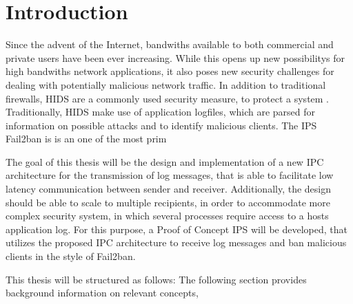 %
%

\chapter{Introduction}
\label{sec:intro}

Since the advent of the Internet, bandwiths available to both
commercial and private users have been ever increasing. While this opens up new possibilitys for high bandwiths
network applications, it also poses new security challenges for dealing with potentially malicious network traffic. In addition to traditional firewalls, 
\ac{HIDS} are a commonly used security measure, to protect a system  . Traditionally, \ac{HIDS} make use of application logfiles, which are parsed
for information on possible attacks and to identify malicious clients. The \ac{IPS} Fail2ban\cite{fail2ban} is 
is an one of the most prim
\par
The goal of this thesis will be the design and implementation of a new \ac{IPC} architecture for the
transmission of log messages, that is able to facilitate low latency communication
between sender and receiver. Additionally, the design should be able to scale to multiple
recipients, in order to accommodate more complex security system, in which several processes
require access to a hosts application log. For this purpose, a Proof of Concept \ac{IPS} will be 
developed, that utilizes the proposed \ac{IPC} architecture to receive log messages and ban malicious
clients in the style of Fail2ban. 


This thesis will be structured as follows: The following section provides background 
information on relevant concepts,  